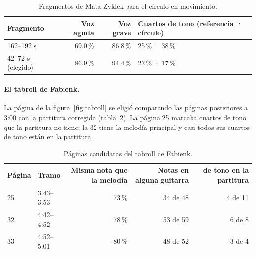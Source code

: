 \begin{table}[ht]
  \centering\small
  \caption{Fragmentos de Mata Zyklek para el círculo en movimiento.}\label{tab:fragmento}
  \begin{tabular}{@{}lrrl@{}}
    \toprule
    Fragmento & Voz aguda & Voz grave & Cuartos de tono (referencia · círculo) \\
    \midrule
    162--192 s & 69.0\,\% & 86.8\,\% & 25\,\% · 38\,\% \\
    42--72 s (elegido) & 86.9\,\% & 94.4\,\% & 23\,\% · 17\,\% \\
    \bottomrule
  \end{tabular}
\end{table}

\paragraph{El tabroll de Fabienk.} La página de la figura~\ref{fig:tabroll} se eligió comparando las páginas posteriores a
3:00 con la partitura corregida (tabla~\ref{tab:paginas}). La página 25 marcaba cuartos de tono que la partitura no tiene;
la 32 tiene la melodía principal y casi todos sus cuartos de tono están en la partitura.

\begin{table}[ht]
  \centering\small
  \caption{Páginas candidatas del tabroll de Fabienk.}\label{tab:paginas}
  \begin{tabular}{@{}llrrr@{}}
    \toprule
    Página & Tramo & Misma nota que la melodía & Notas en alguna guitarra & \cuarto{} de tono en la partitura \\
    \midrule
    25 & 3:43--3:53 & 73\,\% & 34 de 48 & 4 de 11 \\
    32 & 4:42--4:52 & 78\,\% & 53 de 59 & 6 de 8 \\
    33 & 4:52--5:01 & 80\,\% & 48 de 52 & 3 de 4 \\
    \bottomrule
  \end{tabular}
\end{table}
